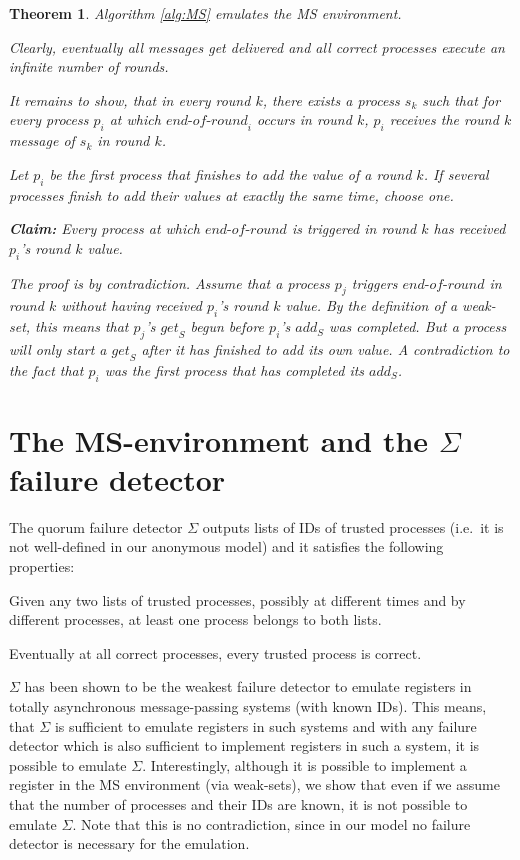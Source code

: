 \documentclass[conference, compsoc]{IEEEtran}
\newtheorem{theorem}{Theorem}
\def\endofround{\textit{end-of-round}}
\def\get{\textit{get}}
\def\add{\textit{add}}
\begin{document}
\begin{theorem}
 Algorithm \ref{alg:MS} emulates the MS environment. 
 \begin{IEEEproof}
 Clearly, eventually all messages get delivered and all correct processes execute an infinite number of rounds.
 
It remains to show, that in every round $k$, there exists a process $s_k$ such that for every process $p_i$ at which $\endofround_i$ occurs in round $k$, $p_i$ receives the round $k$ message of $s_k$ in round $k$.

Let $p_i$ be the first process that finishes to add the value of a round $k$. If several processes finish to add their values at exactly the same time, choose one. 

\textbf{Claim:} Every process at which $\endofround$ is triggered in round $k$ has  received $p_i$'s round $k$ value.

The proof is by contradiction. Assume that a process $p_j$ triggers $\endofround$ in round $k$ without having received $p_i$'s round $k$ value. By the definition of a weak-set, this means that $p_j$'s $\get_S$ begun before $p_i$'s $\add_S$ was completed. But a process will only start a $\get_S$ after it has finished to add its own value. A contradiction to the fact that $p_i$ was the first process that has completed its $\add_S$.   
 \end{IEEEproof}
\end{theorem}

\section{The MS-environment and the $\Sigma$ failure detector}

The quorum failure detector $\Sigma$ \cite{200377/IC} outputs lists of IDs of trusted processes (i.e.~it is not well-defined in our anonymous model) and it satisfies the following properties:
\begin{description} 
 \item[Intersection:] Given any two lists of trusted processes, possibly at different times and by different processes, at least one process belongs to both lists. 
 \item[Completeness:] Eventually at all correct processes, every trusted process is correct.
\end{description}

$\Sigma$ has been shown to be the weakest failure detector to emulate registers in totally asynchronous message-passing systems \cite{200377/IC} (with known IDs). This means, that $\Sigma$ is sufficient to emulate registers in such systems and with any failure detector which is also sufficient to implement registers in such a system, it is possible to emulate $\Sigma$. 
Interestingly, although it is possible to implement a register in the MS environment (via weak-sets), we show that even if we assume that the number of processes and their IDs are known, it is not possible to emulate $\Sigma$. Note that this is no contradiction, since in our model no failure detector is necessary for the emulation. 
\end{document}
